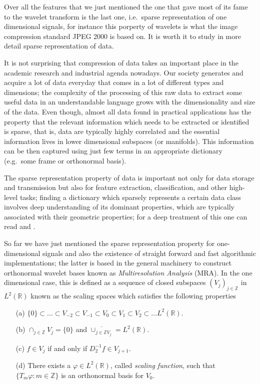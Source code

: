 \bigskip

Over all the features that we just mentioned the one that gave most of its fame to the wavelet transform is the last one, i.e.\ sparse representation of one dimensional signals, for instance this porperty of wavelets is what the image compression standard JPEG 2000 is based on. It is worth it to study in more detail sparse representation of data.

\bigskip

It is not surprising that compression of data takes an important place in the academic research and industrial agenda nowadays. Our society generates and acquire a lot of data everyday that comes in a lot of different types and dimensions; the complexity of the processing of this raw data to extract some useful data in an understandable language grows with the dimensionality and size of the data. Even though, almost all data found in practical applications has the property that the relevant information which needs to be extracted or identified is sparse, that is, data are typically highly correlated and the essential information lives in lower dimensional subspaces (or manifolds). This information can be then captured using just few terms in an appropriate dictionary (e.g.\ some frame or orthonormal basis). 

\bigskip

The sparse representation property of data is important not only for data storage and transmission but also for feature extraction, classification, and other high-level tasks; finding a dictionary which sparsely represents a certain data class involves deep understanding of its dominant properties, which are typically associated with their geometric properties; for a deep treatment of this one can read \cite{IntroShearlets} and \cite{Gitta-Lim}.

\bigskip

So far we have just mentioned the sparse representation property for one-dimensional signals and also the existence of straight forward and fast algorithmic implementations; the latter is based in the general machinery to construct orthonormal wavelet bases known as \textit{Multiresolution Analysis} (MRA). In the one dimensional case, this is defined as a sequence of closed subspaces $(V_j)_{j\in\mathbb{Z}}$ in $L^2(\mathbb{R})$ known as the scaling spaces which satisfies the following properties

\begin{enumerate}
\item[(a)] $\{0\}\subset\ldots\subset V_{-2}\subset V_{-1}\subset V_0\subset V_1\subset V_2\subset\ldots L^2(\mathbb{R})$.
\item[(b)] $\cap_{j\in\mathbb{Z}}V_j=\{0\}$ and $\overline{\cup_{j\in\mathbb{Z}V_j}}=L^2(\mathbb{R})$.
\item[(c)] $f\in V_j$ if and only if $D_2^{-1}f\in V_{j+1}$.
\item[(d)] There exists a $\varphi\in L^2(\mathbb{R})$, called \textit{scaling function}, such that $\{T_m\varphi:m\in\mathbb{Z}\}$ is an orthonormal basis for $V_0$.
\end{enumerate}


